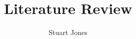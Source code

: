 \documentclass[a4paper, 10pt]{article}
\begin{document}
\title{Literature Review}
\author{Stuart Jones}
\maketitle
\newpage
\tableofcontents
\newpage









\newpage

\end{document}

